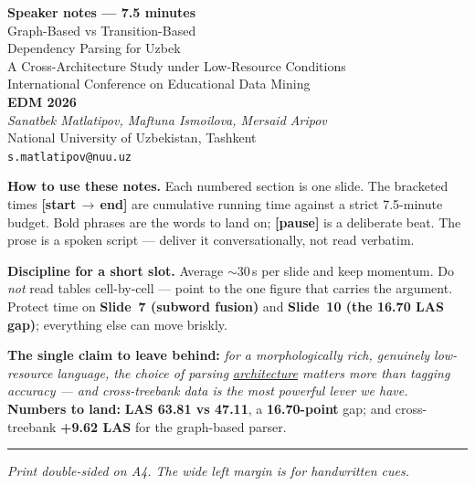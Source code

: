 \documentclass[12pt,a4paper]{article}
\begin{document}
\begin{center}
   {\LARGE\bfseries Speaker notes --- 7.5 minutes}\\[0.6em]
   {\large Graph-Based vs Transition-Based\\Dependency Parsing for Uzbek}\\[0.3em]
   {\normalsize A Cross-Architecture Study under Low-Resource Conditions}\\[0.6em]
   {\normalsize International Conference on Educational Data Mining}\\
   {\normalsize \textbf{EDM 2026}}\\[1.2em]
   \textit{Sanatbek Matlatipov, Maftuna Ismoilova, Mersaid Aripov}\\
   National University of Uzbekistan, Tashkent\\
   \texttt{s.matlatipov@nuu.uz}
\end{center}

\vspace{1em}
\noindent\textbf{How to use these notes.}
Each numbered section is one slide. The bracketed times
\textbf{[start\,$\to$\,end]} are cumulative running time against a strict
7.5-minute budget. Bold phrases are the words to land on; \textbf{[pause]}
is a deliberate beat. The prose is a spoken script --- deliver it
conversationally, not read verbatim.

\vspace{0.5em}
\noindent\textbf{Discipline for a short slot.} Average $\sim$30\,s per
slide and keep momentum. Do \emph{not} read tables cell-by-cell --- point
to the one figure that carries the argument. Protect time on
\textbf{Slide~7 (subword fusion)} and \textbf{Slide~10 (the 16.70 LAS
gap)}; everything else can move briskly.

\vspace{0.5em}
\noindent\textbf{The single claim to leave behind:} \emph{for a
morphologically rich, genuinely low-resource language, the choice of
parsing \underline{architecture} matters more than tagging accuracy ---
and cross-treebank data is the most powerful lever we have.}
\textbf{Numbers to land:} \textbf{LAS 63.81 vs 47.11}, a
\textbf{16.70-point} gap; and cross-treebank \textbf{+9.62 LAS} for the
graph-based parser.

\vfill\hrule\vspace{0.5em}
\noindent\textit{Print double-sided on A4. The wide left margin is for handwritten cues.}
\end{document}
